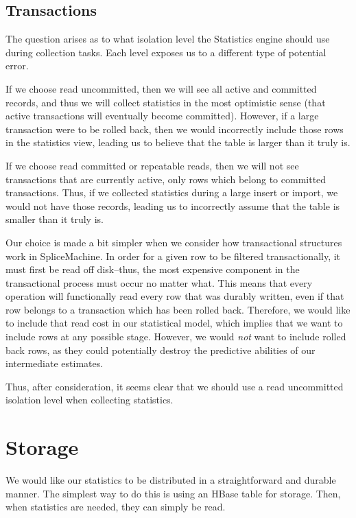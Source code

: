 \subsection{Transactions}
The question arises as to what isolation level the Statistics engine should use during collection tasks. Each level exposes us to a different type of potential error. 

If we choose read uncommitted, then we will see all active and committed records, and thus we will collect statistics in the most optimistic sense (that active transactions will eventually become committed). However, if a large transaction were to be rolled back, then we would incorrectly include those rows in the statistics view, leading us to believe that the table is larger than it truly is.

If we choose read committed or repeatable reads, then we will not see transactions that are currently active, only rows which belong to committed transactions. Thus, if we collected statistics during a large insert or import, we would not have those records, leading us to incorrectly assume that the table is smaller than it truly is.

Our choice is made a bit simpler when we consider how transactional structures work in SpliceMachine. In order for a given row to be filtered transactionally, it must first be read off disk--thus, the most expensive component in the transactional process must occur no matter what. This means that every operation will functionally read every row that was durably written, even if that row belongs to a transaction which has been rolled back. Therefore, we would like to include that read cost in our statistical model, which implies that we want to include rows at any possible stage. However, we would \emph{not} want to include rolled back rows, as they could potentially destroy the predictive abilities of our intermediate estimates. 

Thus, after consideration, it seems clear that we should use a read uncommitted isolation level when collecting statistics.

\section{Storage}
\label{sec:Storage}
We would like our statistics to be distributed in a straightforward and durable manner. The simplest way to do this is using an HBase table for storage. Then, when statistics are needed, they can simply be read.

